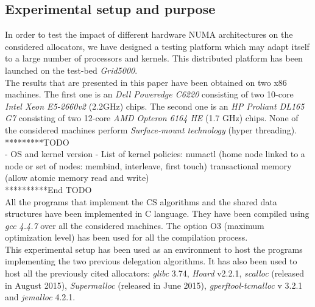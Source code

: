 \documentclass[10pt]{article}											%
\begin{document}

\subsection{Experimental setup and purpose}
In order to test the impact of different hardware NUMA architectures on the considered allocators, we have designed a testing platform which may adapt itself to a large number of processors and kernels.   This distributed platform has been launched on the test-bed \textit{Grid5000}.\\
The results that are presented in this paper have been obtained on two x86 machines.   The first one is an \textit{Dell Poweredge C6220} consisting of two 10-core \textit{Intel Xeon E5-2660v2} (2.2GHz) chips.   The second one is an \textit{HP Proliant DL165 G7} consisting of two 12-core \textit{AMD Opteron 6164 HE} (1.7 GHz) chips.
None of the considered machines perform \textit{Surface-mount technology} (hyper threading).\\
*********TODO\\
	- OS and kernel version
    - List of kernel policies: numactl (home node linked to a node or set of nodes: membind, interleave, first touch) transactional memory (allow atomic memory read and write)\\
**********End TODO\\
All the programs that implement the CS algorithms and the shared data structures have been implemented in C language.   They have been compiled using \textit{gcc 4.4.7} over all the considered machines.  The option O3 (maximum optimization level) has been used for all the compilation process.\\

This experimental setup has been used as an environment to host the programs implementing the two previous delegation algorithms.   It has also been used to host all the previously cited allocators: \emph{glibc} 3.74, \emph{Hoard} v2.2.1, \emph{scalloc} (released in August 2015), \emph{Supermalloc} (released in June 2015), \emph{gperftool-tcmalloc} v 3.2.1 and \emph{jemalloc} 4.2.1. 


\end{document}
